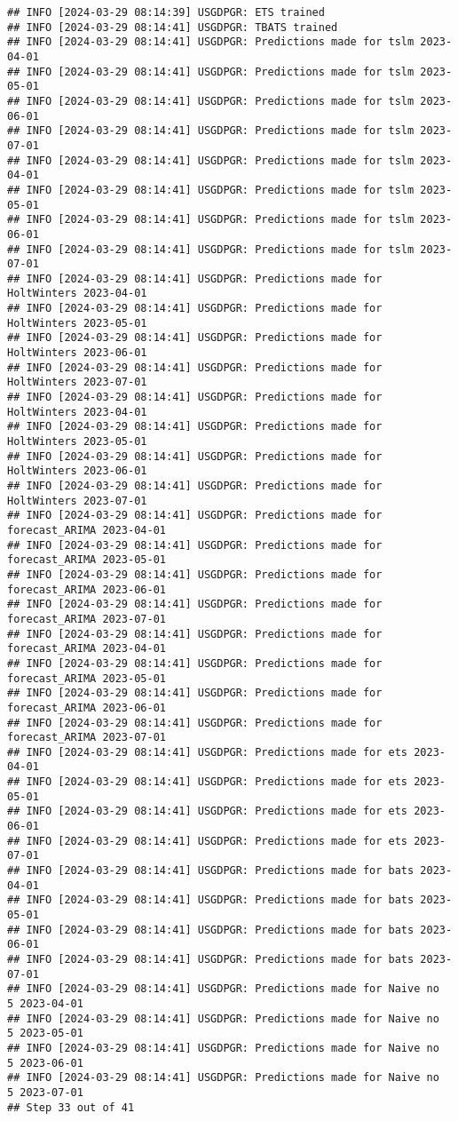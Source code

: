 \documentclass[
]{article}
\begin{document}
\begin{verbatim}
## INFO [2024-03-29 08:14:39] USGDPGR: ETS trained
## INFO [2024-03-29 08:14:41] USGDPGR: TBATS trained
## INFO [2024-03-29 08:14:41] USGDPGR: Predictions made for tslm 2023-04-01
## INFO [2024-03-29 08:14:41] USGDPGR: Predictions made for tslm 2023-05-01
## INFO [2024-03-29 08:14:41] USGDPGR: Predictions made for tslm 2023-06-01
## INFO [2024-03-29 08:14:41] USGDPGR: Predictions made for tslm 2023-07-01
## INFO [2024-03-29 08:14:41] USGDPGR: Predictions made for tslm 2023-04-01
## INFO [2024-03-29 08:14:41] USGDPGR: Predictions made for tslm 2023-05-01
## INFO [2024-03-29 08:14:41] USGDPGR: Predictions made for tslm 2023-06-01
## INFO [2024-03-29 08:14:41] USGDPGR: Predictions made for tslm 2023-07-01
## INFO [2024-03-29 08:14:41] USGDPGR: Predictions made for HoltWinters 2023-04-01
## INFO [2024-03-29 08:14:41] USGDPGR: Predictions made for HoltWinters 2023-05-01
## INFO [2024-03-29 08:14:41] USGDPGR: Predictions made for HoltWinters 2023-06-01
## INFO [2024-03-29 08:14:41] USGDPGR: Predictions made for HoltWinters 2023-07-01
## INFO [2024-03-29 08:14:41] USGDPGR: Predictions made for HoltWinters 2023-04-01
## INFO [2024-03-29 08:14:41] USGDPGR: Predictions made for HoltWinters 2023-05-01
## INFO [2024-03-29 08:14:41] USGDPGR: Predictions made for HoltWinters 2023-06-01
## INFO [2024-03-29 08:14:41] USGDPGR: Predictions made for HoltWinters 2023-07-01
## INFO [2024-03-29 08:14:41] USGDPGR: Predictions made for forecast_ARIMA 2023-04-01
## INFO [2024-03-29 08:14:41] USGDPGR: Predictions made for forecast_ARIMA 2023-05-01
## INFO [2024-03-29 08:14:41] USGDPGR: Predictions made for forecast_ARIMA 2023-06-01
## INFO [2024-03-29 08:14:41] USGDPGR: Predictions made for forecast_ARIMA 2023-07-01
## INFO [2024-03-29 08:14:41] USGDPGR: Predictions made for forecast_ARIMA 2023-04-01
## INFO [2024-03-29 08:14:41] USGDPGR: Predictions made for forecast_ARIMA 2023-05-01
## INFO [2024-03-29 08:14:41] USGDPGR: Predictions made for forecast_ARIMA 2023-06-01
## INFO [2024-03-29 08:14:41] USGDPGR: Predictions made for forecast_ARIMA 2023-07-01
## INFO [2024-03-29 08:14:41] USGDPGR: Predictions made for ets 2023-04-01
## INFO [2024-03-29 08:14:41] USGDPGR: Predictions made for ets 2023-05-01
## INFO [2024-03-29 08:14:41] USGDPGR: Predictions made for ets 2023-06-01
## INFO [2024-03-29 08:14:41] USGDPGR: Predictions made for ets 2023-07-01
## INFO [2024-03-29 08:14:41] USGDPGR: Predictions made for bats 2023-04-01
## INFO [2024-03-29 08:14:41] USGDPGR: Predictions made for bats 2023-05-01
## INFO [2024-03-29 08:14:41] USGDPGR: Predictions made for bats 2023-06-01
## INFO [2024-03-29 08:14:41] USGDPGR: Predictions made for bats 2023-07-01
## INFO [2024-03-29 08:14:41] USGDPGR: Predictions made for Naive no  5 2023-04-01
## INFO [2024-03-29 08:14:41] USGDPGR: Predictions made for Naive no  5 2023-05-01
## INFO [2024-03-29 08:14:41] USGDPGR: Predictions made for Naive no  5 2023-06-01
## INFO [2024-03-29 08:14:41] USGDPGR: Predictions made for Naive no  5 2023-07-01
## Step 33 out of 41
\end{verbatim}
\end{document}
